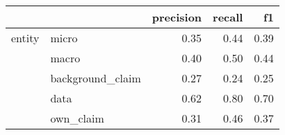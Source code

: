 \begin{tabular}{llrrr}
\toprule
       &           &  precision &  recall &   f1 \\
\midrule
entity & micro &       0.35 &    0.44 & 0.39 \\
       & macro &       0.40 &    0.50 & 0.44 \\
       & background\_claim &       0.27 &    0.24 & 0.25 \\
       & data &       0.62 &    0.80 & 0.70 \\
       & own\_claim &       0.31 &    0.46 & 0.37 \\
\bottomrule
\end{tabular}
